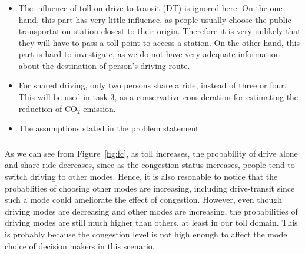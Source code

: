 \documentclass[11pt]{article}
\begin{document}
\subsubsection{}
\begin{itemize}[leftmargin=*]
\item The influence of toll on drive to transit (DT) is ignored here. On the one hand, this part has very little influence, as people usually choose the public transportation station closest to their origin. Therefore it is very unlikely that they will have to pass a toll point to access a station. On the other hand, this part is hard to investigate, as we do not have very adequate information about the destination of person’s driving route. 
\item For shared driving, only two persons share a ride, instead of three or four. This will be used in task 3, as a conservative consideration for estimating the reduction of CO$_2$ emission.
\item The assumptions stated in the problem statement.
\end{itemize}
\subsubsection{}
As we can see from Figure~\ref{fig:fc}, as toll increases, the probability of drive alone and share ride decreases, since as the congestion status increases, people tend to switch driving to other modes. Hence, it is also resonable to notice that the probablities of choosing other modes are increasing, including drive-transit since such a mode could ameliorate the effect of congestion. However, even though driving modes are decreasing and other modes are increasing, the probabilities of driving modes are still much higher than others, at least in our toll domain. This is probably because the congestion level is not high enough to affect the mode choice of decision makers in this scenario.
\ \\
\subsection{}
\end{document}
